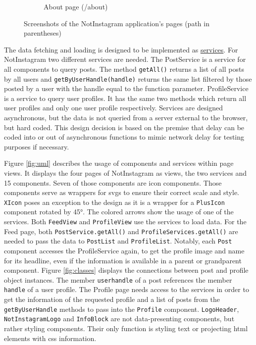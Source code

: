 \documentclass[a4paper, 12pt]{article}
\begin{document}
\begin{figure}[ht!]
\begin{subfigure}{0.49\linewidth}
\begin{center}
    \end{center}
    \caption{About page (/about)}\label{subfig:about}
  \end{subfigure}
  \caption{Screenshots of the NotInstagram application's pages (path in parentheses)}\label{fig:screenshots}
\end{figure}

The data fetching and loading is designed to be implemented as \hyperref[enum:services]{services}.
For NotInstagram two different services are needed.
The PostService is a service for all components to query posts.
The method \verb|getAll()| returns a list of all posts by all users and \verb|getByUserHandle(handle)| returns the same list filtered by those posted by a user with the handle equal to the function parameter.
ProfileService is a service to query user profiles.
It has the same two methods which return all user profiles and only one user profile respectively.
Services are designed asynchronous, but the data is not queried from a server external to the browser, but hard coded.
This design decision is based on the premise that delay can be coded into or out of asynchronous functions to mimic network delay for testing purposes if necessary.

Figure \ref{fig:uml} describes the usage of components and services within page views.
It displays the four pages of NotInstagram as views, the two services and 15 components.
Seven of those components are icon components.
Those components serve as wrappers for \acrshort{svg}s to ensure their correct scale and style.
\verb|XIcon| poses an exception to the design as it is a wrapper for a \verb|PlusIcon| component rotated by 45°.
The colored arrows show the usage of one of the services.
Both \verb|FeedView| and \verb|ProfileView| use the services to load data.
For the Feed page, both \verb|PostService.getAll()| and \verb|ProfileServices.getAll()| are needed to pass the data to \verb|PostList| and \verb|ProfileList|.
Notably, each \verb|Post| component accesses the ProfileService again, to get the profile image and name for its headline, even if the information is available in a parent or grandparent component.
Figure \ref{fig:classes} displays the connections between post and profile object instances.
The member \verb|userhandle| of a post references the member \verb|handle| of a user profile.
The Profile page needs access to the services in order to get the information of the requested profile and a list of posts from the \verb|getByUserHandle| methods to pass into the \verb|Profile| component.
\verb|LogoHeader|, \verb|NotInstagramLogo| and \verb|InfoBlock| are not data-presenting components, but rather styling components.
Their only function is styling text or projecting \acrshort{html} elements with \acrshort{css} information.
\end{document}
